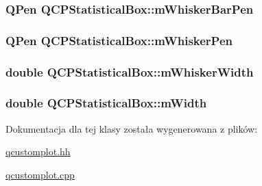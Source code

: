 \subsubsection[{\texorpdfstring{m\+Whisker\+Bar\+Pen}{mWhiskerBarPen}}]{\setlength{\rightskip}{0pt plus 5cm}Q\+Pen Q\+C\+P\+Statistical\+Box\+::m\+Whisker\+Bar\+Pen\hspace{0.3cm}{\ttfamily [protected]}}\hypertarget{class_q_c_p_statistical_box_aa719b1d722a9f82364df1497a6dc1da8}{}\label{class_q_c_p_statistical_box_aa719b1d722a9f82364df1497a6dc1da8}
\subsubsection[{\texorpdfstring{m\+Whisker\+Pen}{mWhiskerPen}}]{\setlength{\rightskip}{0pt plus 5cm}Q\+Pen Q\+C\+P\+Statistical\+Box\+::m\+Whisker\+Pen\hspace{0.3cm}{\ttfamily [protected]}}\hypertarget{class_q_c_p_statistical_box_a25b7552499f0f090fcff02858b2265a5}{}\label{class_q_c_p_statistical_box_a25b7552499f0f090fcff02858b2265a5}
\subsubsection[{\texorpdfstring{m\+Whisker\+Width}{mWhiskerWidth}}]{\setlength{\rightskip}{0pt plus 5cm}double Q\+C\+P\+Statistical\+Box\+::m\+Whisker\+Width\hspace{0.3cm}{\ttfamily [protected]}}\hypertarget{class_q_c_p_statistical_box_a4d166474f845d5db626e8b11a0815a6f}{}\label{class_q_c_p_statistical_box_a4d166474f845d5db626e8b11a0815a6f}
\subsubsection[{\texorpdfstring{m\+Width}{mWidth}}]{\setlength{\rightskip}{0pt plus 5cm}double Q\+C\+P\+Statistical\+Box\+::m\+Width\hspace{0.3cm}{\ttfamily [protected]}}\hypertarget{class_q_c_p_statistical_box_af365e40b0f706c3d76f857c7957f629d}{}\label{class_q_c_p_statistical_box_af365e40b0f706c3d76f857c7957f629d}


Dokumentacja dla tej klasy została wygenerowana z plików\+:\begin{DoxyCompactItemize}
\item 
\hyperlink{qcustomplot_8hh}{qcustomplot.\+hh}\item 
\hyperlink{qcustomplot_8cpp}{qcustomplot.\+cpp}\end{DoxyCompactItemize}
